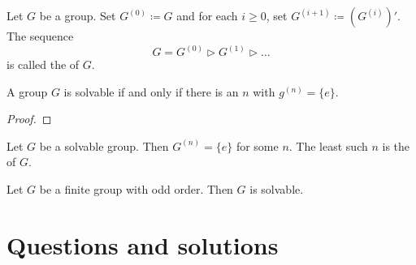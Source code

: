 \begin{definition}
  Let \(G\) be a group. Set \(G^{(0)} \coloneqq G\) and for each \(i \geq 0\), set \(G^{(i+1)} \coloneqq (G^{(i)})'\). The sequence
  \[G = G^{(0)}\triangleright G^{(1)} \triangleright \ldots \]
  is called the  of \(G\).
\end{definition}

\begin{theorem}
  A group \(G\) is solvable if and only if there is an \(n\) with \(g^{(n)} = \{e\}\).
\end{theorem}

\begin{proof}
\end{proof}

\begin{definition}
  Let \(G\) be a solvable group. Then \(G^{(n)} = \{e\}\) for some \(n\). The least such \(n\) is the  of \(G\).
\end{definition}

\begin{theorem}
  Let \(G\) be a finite group with odd order. Then \(G\) is solvable.
\end{theorem}

\section{Questions and solutions}\label{sec:group-theory:questions}

